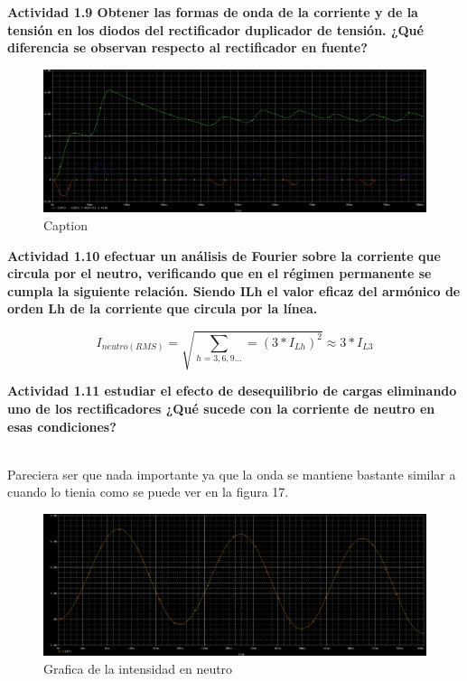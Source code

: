 ﻿\documentclass[letterpaper]{article}
\begin{document}
 \begin{large}

\textbf{Actividad 1.9 Obtener las formas de onda de la corriente y de la tensión
en los diodos del rectificador duplicador de tensión. ¿Qué diferencia
se observan respecto al rectificador en fuente? }\end{large}
 \begin{large}
 \begin{figure}[htb]
     \centering
     \includegraphics[scale=0.3]{ondacdup.png}
     \caption{Caption}
     \label{fig:my_label}
 \end{figure}

\textbf{Actividad 1.10 efectuar un análisis de Fourier sobre la corriente
que circula por el neutro, verificando que en el régimen permanente
se cumpla la siguiente relación. Siendo ILh el valor eficaz del armónico
de orden Lh de la corriente que circula por la línea.}\end{large} 
 \begin{large}
\[
I_{neutro(RMS)}=\sqrt{\sum_{h=3,6,9...}=(3*I_{Lh})^{2}}\approx3*I_{L3}
\]\end{large}
 \begin{large}

\textbf{Actividad 1.11 estudiar el efecto de desequilibrio de cargas eliminando
uno de los rectificadores ¿Qué sucede con la corriente de neutro en
esas condiciones?} \end{large}\\
Pareciera ser que nada importante ya que la onda se mantiene bastante similar a cuando lo tienia como se puede ver en la figura 17.\\
\begin{figure}[htb]
    \centering
    \includegraphics[scale=0.3]{intneu.png}
    \caption{Grafica de la intensidad en neutro}
    \label{fig:my_la45l}
\end{figure}
\end{document}
